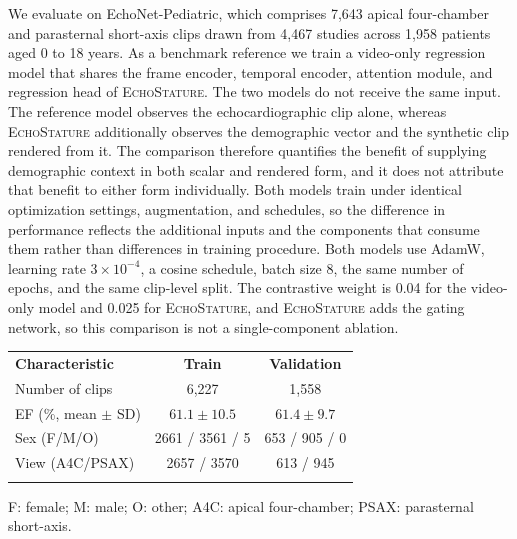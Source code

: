 \documentclass{ws-procs11x85}
\begin{document}
We evaluate on EchoNet-Pediatric, which comprises 7,643 apical four-chamber and parasternal short-axis clips drawn from 4,467 studies across 1,958 patients aged 0 to 18 years.\cite{reddy2023echonetpeds}
As a benchmark reference we train a video-only regression model that shares the frame encoder, temporal encoder, attention module, and regression head of \textsc{EchoStature}.
The two models do not receive the same input.
The reference model observes the echocardiographic clip alone, whereas \textsc{EchoStature} additionally observes the demographic vector and the synthetic clip rendered from it.
The comparison therefore quantifies the benefit of supplying demographic context in both scalar and rendered form, and it does not attribute that benefit to either form individually.
{\color{blue}Both models train under identical optimization settings, augmentation, and schedules, so the difference in performance reflects the additional inputs and the components that consume them rather than differences in training procedure.}
{\color{red}Both models use AdamW, learning rate \(3\times 10^{-4}\), a cosine schedule, batch size 8, the same number of epochs, and the same clip-level split. The contrastive weight is 0.04 for the video-only model and 0.025 for \textsc{EchoStature}, and \textsc{EchoStature} adds the gating network, so this comparison is not a single-component ablation.}




\begin{table}[t]
{
\small
\begin{tabular}{@{}lcc@{}}
\toprule
\textbf{Characteristic} & \textbf{Train} & \textbf{Validation} \\
\colrule
Number of clips & 6,227 & 1,558 \\
EF (\%, mean $\pm$ SD) & $61.1 \pm 10.5$ & $61.4 \pm 9.7$ \\
Sex (F/M/O) & 2661 / 3561 / 5 & 653 / 905 / 0 \\
View (A4C/PSAX) & 2657 / 3570 & 613 / 945 \\
\botrule
\end{tabular}
}
\begin{center}
\footnotesize
F: female; M: male; O: other; A4C: apical four-chamber; PSAX: parasternal short-axis.
\end{center}
\label{tab:dataset_summary}
\end{table}
\end{document}
